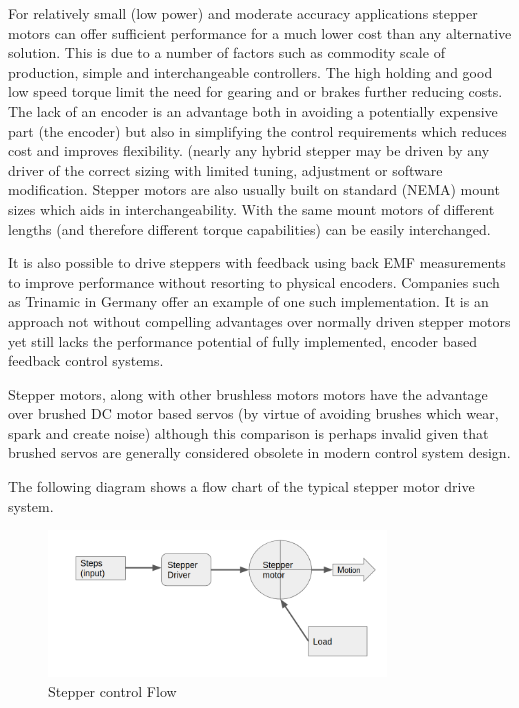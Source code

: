 \documentclass{article}
\begin{document}
\par
For relatively small (low power) and moderate accuracy applications stepper motors can offer sufficient performance for a much lower cost than any alternative solution. This is due to a number of factors such as commodity scale of production, simple and interchangeable controllers. The high holding and good low speed torque limit the need for gearing and or brakes further reducing costs. The lack of an encoder is an advantage both in avoiding a potentially expensive part (the encoder) but also in simplifying the control requirements which reduces cost and improves flexibility. (nearly any hybrid stepper may be driven by any driver of the correct sizing with limited tuning, adjustment or software modification. Stepper motors are also usually built on standard (NEMA) mount sizes which aids in interchangeability. With the same mount motors of different lengths (and therefore different torque capabilities) can be easily interchanged. 
\par
It is also possible to drive steppers with feedback using back EMF measurements to improve performance without resorting to physical encoders. Companies such as Trinamic in Germany offer an  example of one such implementation. It is an approach not without compelling advantages over normally driven stepper motors yet still lacks the performance potential of fully implemented, encoder based feedback control systems.  
\par
Stepper motors, along with other brushless motors motors have the advantage over brushed DC motor based servos (by virtue of avoiding brushes which wear, spark and create noise) although this comparison is perhaps invalid given that brushed servos are generally considered obsolete in modern control system design.  
\par 
The following diagram shows a flow chart of the typical stepper motor drive system. 

\begin{figure}[h!]
  \centering
  \includegraphics[width=0.8\textwidth]{SM_flow.png}
  \captionsetup{justification=centering}
  \caption{Stepper control Flow}
   \label{fig:SM}
\end{figure}
\end{document}
